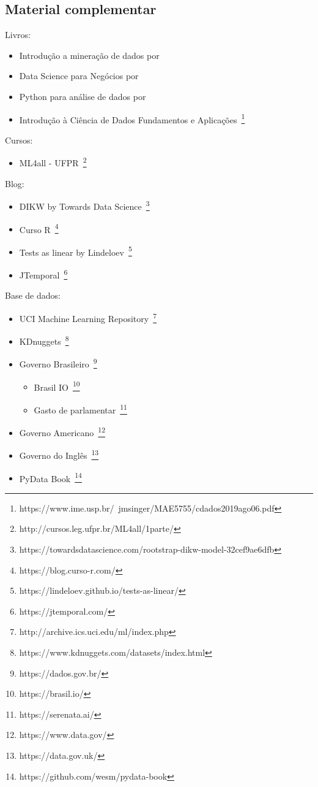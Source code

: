 \subsection{Material complementar}

Livros:
\begin{itemize}
	\item Introdução a mineração de dados por~
	\item Data Science para Negócios por~
	\item Python para análise de dados por~
	\item Introdução à Ciência de Dados Fundamentos e Aplicações~\footnote{https://www.ime.usp.br/~jmsinger/MAE5755/cdados2019ago06.pdf}
\end{itemize}


Cursos:
\begin{itemize}
	\item ML4all - UFPR~\footnote{http://cursos.leg.ufpr.br/ML4all/1parte/}
\end{itemize}


Blog:
\begin{itemize}
	\item DIKW by Towards Data Science~\footnote{https://towardsdatascience.com/rootstrap-dikw-model-32cef9ae6dfb}
	\item Curso R~\footnote{https://blog.curso-r.com/}
	\item Tests as linear by Lindeloev~\footnote{https://lindeloev.github.io/tests-as-linear/}
	\item JTemporal~\footnote{https://jtemporal.com/}
\end{itemize}


Base de dados:
\begin{itemize}
	\item UCI Machine Learning Repository~\footnote{http://archive.ics.uci.edu/ml/index.php}
	\item KDnuggets~\footnote{https://www.kdnuggets.com/datasets/index.html}
	\item Governo Brasileiro~\footnote{https://dados.gov.br/}
	      \begin{itemize}
		      \item Brasil IO~\footnote{https://brasil.io/}
		      \item Gasto de parlamentar~\footnote{https://serenata.ai/}
	      \end{itemize}
	\item Governo Americano~\footnote{https://www.data.gov/}
	\item Governo do Inglês~\footnote{https://data.gov.uk/}
	\item PyData Book~\footnote{https://github.com/wesm/pydata-book}
\end{itemize}
